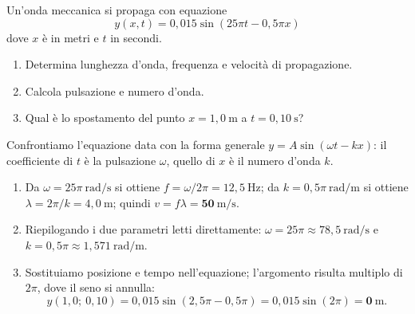 \begin{question}[ID=1.4, subtitle={Onda meccanica su corda — parametri dalla equazione}, tags={onde, caratteristiche}, difficulty=media]
Un'onda meccanica si propaga con equazione
\[ y(x,t) = 0{,}015 \sin(25\pi t - 0{,}5\pi x) \]
dove $x$ è in metri e $t$ in secondi.
\begin{enumerate}
\item Determina lunghezza d'onda, frequenza e velocità di propagazione.
\item Calcola pulsazione e numero d'onda.
\item Qual è lo spostamento del punto $x = 1{,}0\ \mathrm{m}$ a $t = 0{,}10\ \mathrm{s}$?
\end{enumerate}
\begin{solution}
Confrontiamo l'equazione data con la forma generale $y = A\sin(\omega t - kx)$: il coefficiente di $t$ è la pulsazione $\omega$, quello di $x$ è il numero d'onda $k$.
\begin{enumerate}
\item Da $\omega = 25\pi\ \mathrm{rad/s}$ si ottiene $f = \omega/2\pi = 12{,}5\ \mathrm{Hz}$; da $k = 0{,}5\pi\ \mathrm{rad/m}$ si ottiene $\lambda = 2\pi/k = 4{,}0\ \mathrm{m}$; quindi $v = f\lambda = \mathbf{50\ \mathrm{m/s}}$.
\item Riepilogando i due parametri letti direttamente: $\omega = 25\pi \approx 78{,}5\ \mathrm{rad/s}$ e $k = 0{,}5\pi \approx 1{,}571\ \mathrm{rad/m}$.
\item Sostituiamo posizione e tempo nell'equazione; l'argomento risulta multiplo di $2\pi$, dove il seno si annulla:
\[
y(1{,}0;\ 0{,}10) = 0{,}015\sin(2{,}5\pi - 0{,}5\pi) = 0{,}015\sin(2\pi) = \mathbf{0\ \mathrm{m}}.
\]
\end{enumerate}
\end{solution}
\end{question}

